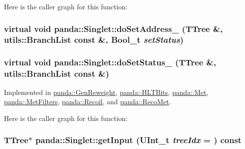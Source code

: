 Here is the caller graph for this function:\hypertarget{classpanda_1_1Singlet_a7ca72a80987071e7176c51947e319474}{
\subsubsection[{doSetAddress\_\-}]{\setlength{\rightskip}{0pt plus 5cm}virtual void panda::Singlet::doSetAddress\_\- (TTree \&, \/  {\bf utils::BranchList} const \&, \/  Bool\_\-t {\em setStatus})}}
\label{classpanda_1_1Singlet_a7ca72a80987071e7176c51947e319474}
\hypertarget{classpanda_1_1Singlet_a660799e379f7949f3b8e2d74f6e1ddb2}{
\subsubsection[{doSetStatus\_\-}]{\setlength{\rightskip}{0pt plus 5cm}virtual void panda::Singlet::doSetStatus\_\- (TTree \&, \/  {\bf utils::BranchList} const \&)}}
\label{classpanda_1_1Singlet_a660799e379f7949f3b8e2d74f6e1ddb2}


Implemented in \hyperlink{classpanda_1_1GenReweight_ac8e96798e059c6ddcbec6e0f91ab8190}{panda::GenReweight}, \hyperlink{classpanda_1_1HLTBits_ae031e46f650668194269fec06b95ef72}{panda::HLTBits}, \hyperlink{classpanda_1_1Met_a3ed51e1633313fa1fb5f5dbda38108c8}{panda::Met}, \hyperlink{classpanda_1_1MetFilters_a48c76c6289784dda542350d88e05aa66}{panda::MetFilters}, \hyperlink{classpanda_1_1Recoil_a68fa34c56d13dae0010ad93e1092ca4f}{panda::Recoil}, and \hyperlink{classpanda_1_1RecoMet_ada709eee42912be17dc1575083bc5f99}{panda::RecoMet}.

Here is the caller graph for this function:\hypertarget{classpanda_1_1Singlet_ac0c8b93ca8f4085700bddb786bae4b02}{
\subsubsection[{getInput}]{\setlength{\rightskip}{0pt plus 5cm}TTree$\ast$ panda::Singlet::getInput (UInt\_\-t {\em treeIdx} = {}) const}}
\label{classpanda_1_1Singlet_ac0c8b93ca8f4085700bddb786bae4b02}


